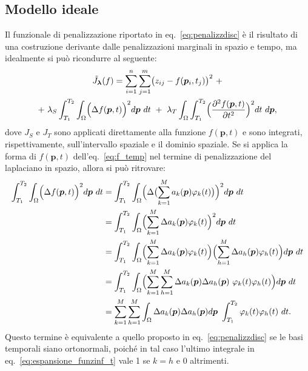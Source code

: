 \documentclass[a4paper,11pt,twoside,openright]{book}							%
\begin{document}
\subsection{Modello ideale}
Il funzionale di penalizzazione riportato in eq.~\ref{eq:penalizzdisc} è il risultato di una costruzione derivante dalle penalizzazioni marginali in spazio e tempo, ma idealmente si può ricondurre al seguente:
\begin{multline}
\label{eq:Jfunc_cont}
\tilde J_{\bm \lambda }(f) = \sum_{i=1}^n \sum_{j=1}^m \bigl( z_{ij} - f(\bm p_i,t_j) \bigr)^2 \ + \\+\   \lambda_S \int_{T_1}^{T_2} \int_\Omega \Bigl( \Delta f(\bm p, t)  \Bigr)^2 d\bm p\ dt \ +\  \lambda_T \int_\Omega \int_{T_1}^{T_2} \Bigl( \frac{\partial^2 f(\bm p, t) }{\partial t ^2} \Bigr)^2 dt\ d\bm p ,
\end{multline}
dove $J_S$ e $J_T$ sono applicati direttamente alla funzione $f(\bm p, t)$ e sono integrati, rispettivamente, sull'intervallo spaziale e il dominio spaziale. Se si applica la forma di $f(\bm p,t)$ dell'eq.~\ref{eq:f_temp} nel termine di penalizzazione del laplaciano in spazio, allora si può ritrovare:
\begin{equation} 
\label{eq:espansione_funzinf_t}
\begin{split}
\int_{T_1}^{T_2} \int_\Omega \Bigl( \Delta f(\bm p, t)  \Bigr)^2 d\bm p\ dt 
&=\int_{T_1}^{T_2} \int_\Omega \Bigl( \Delta \bigl( \sum_{k=1}^M a_k(\bm p) \varphi_k(t) \bigr)  \Bigr)^2 d\bm p\ dt \\
&=\int_{T_1}^{T_2} \int_\Omega \Bigl( \sum_{k=1}^M \Delta a_k(\bm p) \varphi_k(t)  \Bigr)^2 d\bm p\ dt \\
&=\int_{T_1}^{T_2} \int_\Omega \Bigl( \sum_{k=1}^M \Delta a_k(\bm p) \varphi_k(t)  \Bigr)\Bigl( \sum_{h=1}^M \Delta a_h(\bm p) \varphi_h(t)  \Bigr) d\bm p\ dt \\
&=\int_{T_1}^{T_2} \int_\Omega \Bigl( \sum_{k=1}^M \sum_{h=1}^M \Delta a_k(\bm p)\Delta a_h(\bm p)\ \varphi_k(t)  \varphi_h(t)  \Bigr) d\bm p\ dt \\
&=\sum_{k=1}^M \sum_{h=1}^M \int_\Omega   \Delta a_k(\bm p) \Delta a_h(\bm p)d\bm p \ \int_{T_1}^{T_2} \varphi_k(t)\varphi_h(t)   \ dt .
\end{split}
\end{equation}
Questo termine è equivalente a quello proposto in eq.~\ref{eq:penalizzdisc} se le basi temporali siano ortonormali, poiché in tal caso l'ultimo integrale in eq.~\ref{eq:espansione_funzinf_t} vale 1 se $k=h$ e 0 altrimenti.
\end{document}
